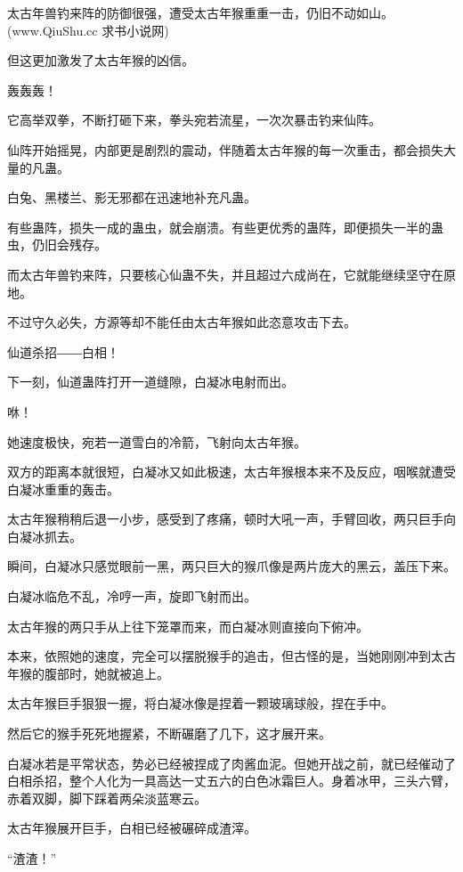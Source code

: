 
\begin{this_body}

太古年兽钓来阵的防御很强，遭受太古年猴重重一击，仍旧不动如山。(www.QiuShu.cc 求书小说网)

但这更加激发了太古年猴的凶信。

轰轰轰！

它高举双拳，不断打砸下来，拳头宛若流星，一次次暴击钓来仙阵。

仙阵开始摇晃，内部更是剧烈的震动，伴随着太古年猴的每一次重击，都会损失大量的凡蛊。

白兔、黑楼兰、影无邪都在迅速地补充凡蛊。

有些蛊阵，损失一成的蛊虫，就会崩溃。有些更优秀的蛊阵，即便损失一半的蛊虫，仍旧会残存。

而太古年兽钓来阵，只要核心仙蛊不失，并且超过六成尚在，它就能继续坚守在原地。

不过守久必失，方源等却不能任由太古年猴如此恣意攻击下去。

仙道杀招――白相！

下一刻，仙道蛊阵打开一道缝隙，白凝冰电射而出。

咻！

她速度极快，宛若一道雪白的冷箭，飞射向太古年猴。

双方的距离本就很短，白凝冰又如此极速，太古年猴根本来不及反应，咽喉就遭受白凝冰重重的轰击。

太古年猴稍稍后退一小步，感受到了疼痛，顿时大吼一声，手臂回收，两只巨手向白凝冰抓去。

瞬间，白凝冰只感觉眼前一黑，两只巨大的猴爪像是两片庞大的黑云，盖压下来。

白凝冰临危不乱，冷哼一声，旋即飞射而出。

太古年猴的两只手从上往下笼罩而来，而白凝冰则直接向下俯冲。

本来，依照她的速度，完全可以摆脱猴手的追击，但古怪的是，当她刚刚冲到太古年猴的腹部时，她就被追上。

太古年猴巨手狠狠一握，将白凝冰像是捏着一颗玻璃球般，捏在手中。

然后它的猴手死死地握紧，不断碾磨了几下，这才展开来。

白凝冰若是平常状态，势必已经被捏成了肉酱血泥。但她开战之前，就已经催动了白相杀招，整个人化为一具高达一丈五六的白色冰霜巨人。身着冰甲，三头六臂，赤着双脚，脚下踩着两朵淡蓝寒云。

太古年猴展开巨手，白相已经被碾碎成渣滓。

“渣渣！”


\end{this_body}
